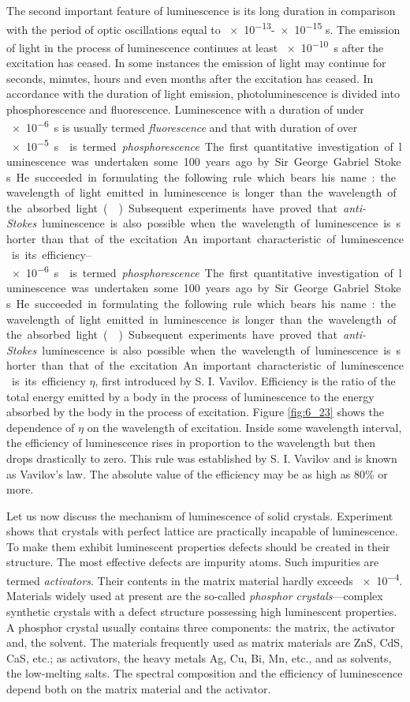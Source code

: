 The second important feature of luminescence is its long duration in comparison with the period of optic oscillations equal to \num{e-13}-\num{e-15} \si{\second}. The emission of light in the process of luminescence continues at least \SI{e-10}{\second} after the excitation has ceased. In some
instances the emission of light may continue for seconds, minutes, hours and even months after the excitation has ceased. In accordance with the duration of light emission, photoluminescence is divided into phosphorescence and fluorescence. Luminescence with a duration of under \SI{e-6}{\second} is usually termed \textit{fluorescence} and that with duration of over \SIrange{e-5}{e-6}\second{} is termed \textit{phosphorescence}.

The first quantitative investigation of luminescence was undertaken some 100 years ago by Sir George Gabriel Stokes. He succeeded in formulating the following rule which bears his name: the wavelength of light emitted in luminescence is longer than the wavelength of the absorbed light (). Subsequent experiments have proved that \textit{anti-Stokes} luminescence is also possible when the wavelength of luminescence is shorter than that of the excitation.

An important characteristic of luminescence is its efficiency $\eta$, first introduced by S. I. Vavilov. Efficiency is the ratio of the total energy emitted by a body in the process of luminescence to the energy absorbed by the body in the process of excitation. Figure \ref{fig:6_23} shows the dependence of $\eta$ on the wavelength of excitation. Inside some wavelength interval, the efficiency of luminescence rises in proportion to the wavelength but then drops drastically to zero. This rule was established by S. I. Vavilov and is known as Vavilov's law. The absolute value of the efficiency may be as high as $80\%$ or more.

Let us now discuss the mechanism of luminescence of solid crystals. Experiment shows that crystals with perfect lattice are practically incapable of luminescence. To make them exhibit luminescent properties defects should be created in their structure. The most effective defects are impurity atoms. Such impurities are termed \textit{activators}. Their contents in the matrix material hardly exceeds \num{e-4}. Materials widely used at present are the so-called \textit{phosphor crystals}---complex synthetic crystals with a defect structure possessing high luminescent properties. A phosphor crystal usually contains three components: the matrix, the activator and, the solvent. The materials frequently used as matrix materials are ZnS, CdS, CaS, etc.; as activators, the heavy metals Ag, Cu, Bi, Mn, etc., and as solvents, the low-melting salts. The spectral composition and the efficiency of luminescence depend both on the matrix material and the activator.

